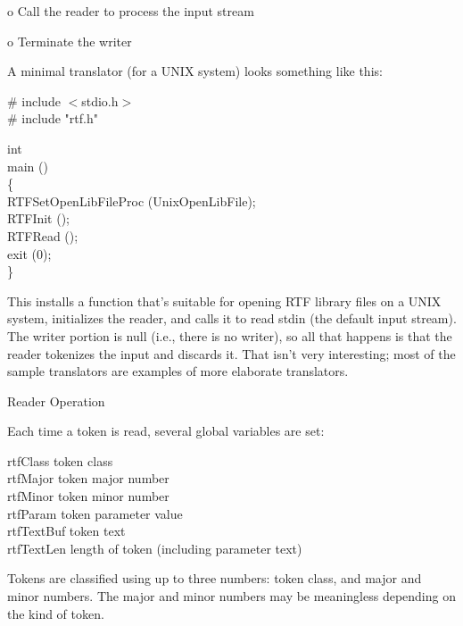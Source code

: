 \documentclass{article}
\begin{document}
\noindent
o	Call the reader to process the input stream



\noindent
o	Terminate the writer




\noindent
A minimal translator (for a UNIX system) looks something like this:




\noindent
\# include	$<$stdio.h$>$\\
\# include	"rtf.h"



\noindent
int\\
main ()\\
\{	\\
RTFSetOpenLibFileProc (UnixOpenLibFile);	\\
RTFInit ();	\\
RTFRead ();	\\
exit (0);\\
\}




\noindent
This installs a function that's suitable for opening RTF library files on 
a UNIX system, initializes the reader, and calls it to read stdin (the default 
input stream). The writer portion is null (i.e., there is no writer), so 
all that happens is that the reader tokenizes the input and discards it. 
That isn't very interesting; most of the sample translators are examples 
of more elaborate translators.




\noindent
Reader Operation






\noindent
Each time a token is read, several global variables are set:






\noindent
rtfClass	token class\\
rtfMajor	token major number\\
rtfMinor	token minor number\\
rtfParam	token parameter value\\
rtfTextBuf	token text\\
rtfTextLen	length of token (including parameter text)






\noindent
Tokens are classified using up to three numbers: token class, and major and 
minor numbers. The major and minor numbers may be meaningless depending on 
the kind of token.
\end{document}
